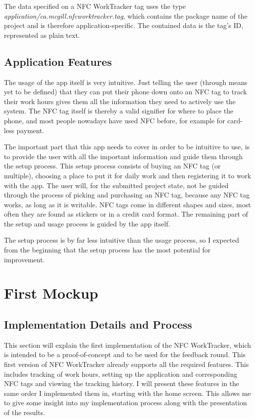 \documentclass[conference]{IEEEtran}
\newcommand{\projectname}{NFC WorkTracker}
\begin{document}
The data specified on a \projectname{} tag uses the type \textit{application/ca.mcgill.nfcworktracker.tag}, which contains the package name of the project and is therefore application-specific. The contained data is the tag's ID, represented as plain text.

\subsection{Application Features}
The usage of the app itself is very intuitive. Just telling the user (through means yet to be defined) that they can put their phone down onto an NFC tag to track their work hours gives them all the information they need to actively use the system. The NFC tag itself is thereby a valid signifier for where to place the phone, and most people nowadays have used NFC before, for example for card-less payment.

The important part that this app needs to cover in order to be intuitive to use, is to provide the user with all the important information and guide them through the setup process.
This setup process consists of buying an NFC tag (or multiple), choosing a place to put it for daily work and then registering it to work with the app.
The user will, for the submitted project state, not be guided through the process of picking and purchasing an NFC tag, because any NFC tag works, as long as it is writable. NFC tags come in different shapes and sizes, most often they are found as stickers or in a credit card format. The remaining part of the setup and usage process is guided by the app itself.

The setup process is by far less intuitive than the usage process, so I expected from the beginning that the setup process has the most potential for improvement.

\section{First Mockup}
\subsection{Implementation Details and Process}
This section will explain the first implementation of the \projectname{}, which is intended to be a proof-of-concept and to be used for the feedback round. This first version of \projectname{} already supports all the required features. This includes tracking of work hours, setting up the application and corresponding NFC tags and viewing the tracking history. I will present these features in the same order I implemented them in, starting with the home screen. This allows me to give some insight into my implementation process along with the presentation of the results.
\end{document}
